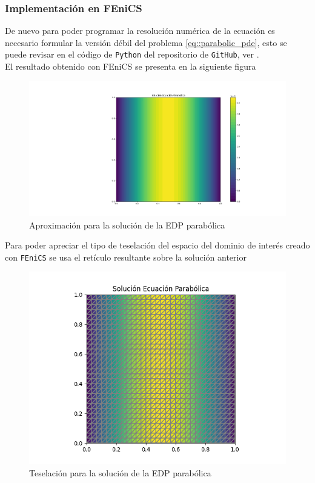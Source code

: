 \documentclass[a4paper]{article}
\begin{document}
\subsubsection{Implementación en FEniCS}
De nuevo para poder programar la resolución numérica de la ecuación es necesario formular la versión débil del problema \ref{eq::parabolic_pde}, esto se puede revisar en el código de \texttt{Python} del repositorio de \texttt{GitHub}, ver \cite{Medina}.\\
El resultado obtenido con FEniCS se presenta en la siguiente figura
\begin{figure}[H]
\begin{center}
\includegraphics[scale=0.29]{./parabolic_FEniCS.png} 
\end{center} 
\caption{Aproximación para la solución de la EDP parabólica}
\label{fig::fig6}
\end{figure}
Para poder apreciar el tipo de teselación del espacio del dominio de interés creado con \texttt{FEniCS} se usa el retículo resultante sobre la solución anterior
\begin{figure}[H]
\begin{center}
\includegraphics[scale=0.49]{./parabolic_FEniCS_mesh.png} 
\end{center} 
\caption{Teselación para la solución de la EDP parabólica}
\label{fig::fig7}
\end{figure}
\end{document}

